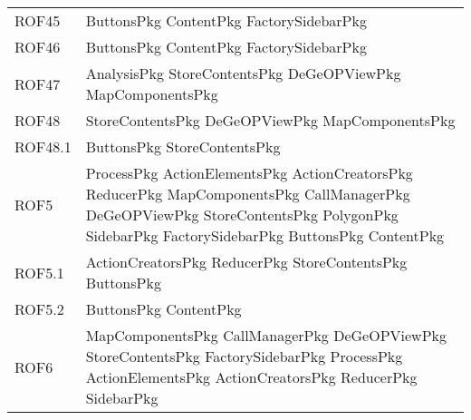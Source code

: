 \begin{longtable}{p{2.5cm}!{\VRule[1pt]}p{5cm}}
		ROF45 & ButtonsPkg \newline ContentPkg \newline FactorySidebarPkg\\
		ROF46 & ButtonsPkg \newline ContentPkg \newline FactorySidebarPkg\\
		ROF47 & AnalysisPkg \newline StoreContentsPkg \newline DeGeOPViewPkg \newline MapComponentsPkg\\
		ROF48 & StoreContentsPkg \newline DeGeOPViewPkg \newline MapComponentsPkg\\
		ROF48.1 & ButtonsPkg \newline StoreContentsPkg\\
		ROF5 & ProcessPkg \newline ActionElementsPkg \newline ActionCreatorsPkg \newline ReducerPkg \newline MapComponentsPkg \newline CallManagerPkg \newline DeGeOPViewPkg \newline StoreContentsPkg \newline PolygonPkg \newline SidebarPkg \newline FactorySidebarPkg \newline ButtonsPkg \newline ContentPkg\\
		ROF5.1 & ActionCreatorsPkg \newline ReducerPkg \newline StoreContentsPkg \newline ButtonsPkg\\
		ROF5.2 & ButtonsPkg \newline ContentPkg\\
		ROF6 & MapComponentsPkg \newline CallManagerPkg \newline DeGeOPViewPkg \newline StoreContentsPkg \newline FactorySidebarPkg \newline ProcessPkg \newline ActionElementsPkg \newline ActionCreatorsPkg \newline ReducerPkg \newline SidebarPkg\\

\end{longtable}
